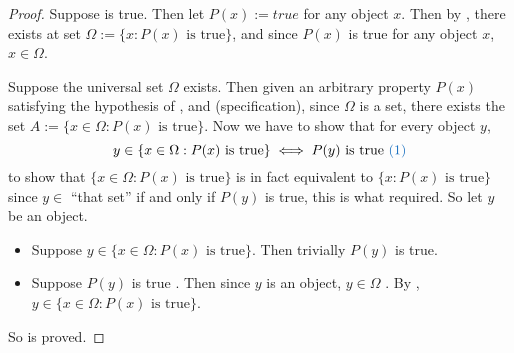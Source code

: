 \begin{proof}
Suppose  is true. Then let \(P(x) := true\) for any object \(x\).
Then by , there exists at set \(\Omega := \{x : P(x) \text{ is true} \}\), and since \(P(x)\) is true for any object \(x\), \(x \in \Omega\).

Suppose the universal set \(\Omega\) exists.
Then given an arbitrary property \(P(x)\) satisfying the hypothesis of , and   (specification), since \(\Omega\) is a set, there exists the set \(A := \{ x \in \Omega : P(x) \text{ is true} \}\).
Now we have to show that for every object \(y\),
\[
    y \in \{x \in \Omega : P(x) \text{ is true} \} \iff P(y) \text{ is true \BLUE{(1)}}
\]
to show that \(\{x \in \Omega : P(x) \text{ is true} \}\) is in fact equivalent to \(\{x : P(x) \text{ is true} \}\) since \(y \in \) ``that set'' if and only if \(P(y)\) is true, this is what  required.
So let \(y\) be an object.
\begin{itemize}
    \item Suppose \(y \in \{x \in \Omega : P(x) \text{ is true} \} \). Then trivially \(P(y)\) is true.
    \item Suppose \(P(y)\) is true . Then since \(y\) is an object, \(y \in \Omega\) . By , \(y \in \{x \in \Omega : P(x) \text{ is true} \} \).
\end{itemize}
So  is proved.
\end{proof}
